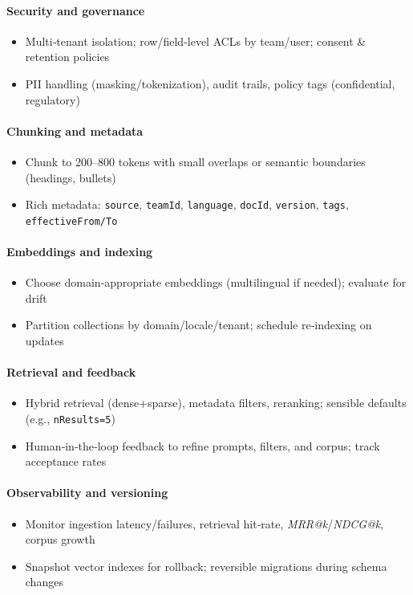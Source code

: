 \documentclass[11pt,a4paper]{article}
\begin{document}
\paragraph{Security and governance}
\begin{itemize}[leftmargin=*]
  \item Multi‑tenant isolation; row/field‑level ACLs by team/user; consent \& retention policies
  \item PII handling (masking/tokenization), audit trails, policy tags (confidential, regulatory)
\end{itemize}

\paragraph{Chunking and metadata}
\begin{itemize}[leftmargin=*]
  \item Chunk to 200–800 tokens with small overlaps or semantic boundaries (headings, bullets)
  \item Rich metadata: \texttt{source}, \texttt{teamId}, \texttt{language}, \texttt{docId}, \texttt{version}, \texttt{tags}, \texttt{effectiveFrom/To}
\end{itemize}

\paragraph{Embeddings and indexing}
\begin{itemize}[leftmargin=*]
  \item Choose domain‑appropriate embeddings (multilingual if needed); evaluate for drift
  \item Partition collections by domain/locale/tenant; schedule re‑indexing on updates
\end{itemize}

\paragraph{Retrieval and feedback}
\begin{itemize}[leftmargin=*]
  \item Hybrid retrieval (dense+sparse), metadata filters, reranking; sensible defaults (e.g., \texttt{nResults=5})
  \item Human‑in‑the‑loop feedback to refine prompts, filters, and corpus; track acceptance rates
\end{itemize}

\paragraph{Observability and versioning}
\begin{itemize}[leftmargin=*]
  \item Monitor ingestion latency/failures, retrieval hit‑rate, \textit{MRR@k}/\textit{NDCG@k}, corpus growth
  \item Snapshot vector indexes for rollback; reversible migrations during schema changes
\end{itemize}
\end{document}
